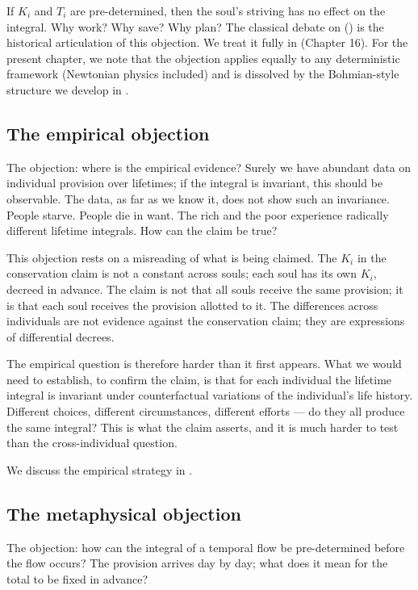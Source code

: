 If $K_i$ and $T_i$ are pre-determined, then the soul's striving has
no effect on the integral. Why work? Why save? Why plan? The
classical  debate on  () is
the historical articulation of this objection. We treat it
fully in  (Chapter 16). For the present chapter, we
note that the objection applies equally to any deterministic
framework (Newtonian physics included) and is dissolved by the
Bohmian-style structure we develop in .

\subsection{The empirical objection}

The objection: where is the empirical evidence? Surely we have
abundant data on individual provision over lifetimes; if the
integral is invariant, this should be observable. The data, as far
as we know it, does not show such an invariance. People starve.
People die in want. The rich and the poor experience radically
different lifetime integrals. How can the claim be true?

This objection rests on a misreading of what is being claimed. The
$K_i$ in the conservation claim is not a constant across souls;
each soul has its own $K_i$, decreed in advance. The claim is not
that all souls receive the same provision; it is that each soul
receives the provision allotted to it. The differences across
individuals are not evidence against the conservation claim; they are
expressions of differential decrees.

The empirical question is therefore harder than it first appears.
What we would need to establish, to confirm the claim, is that for
each individual the lifetime integral is invariant under
counterfactual variations of the individual's life history.
Different choices, different circumstances, different efforts ---
do they all produce the same integral? This is what the claim
asserts, and it is much harder to test than the cross-individual
question.

We discuss the empirical strategy in .

\subsection{The metaphysical objection}

The objection: how can the integral of a temporal flow be
pre-determined before the flow occurs? The provision arrives
day by day; what does it mean for the total to be fixed in advance?

